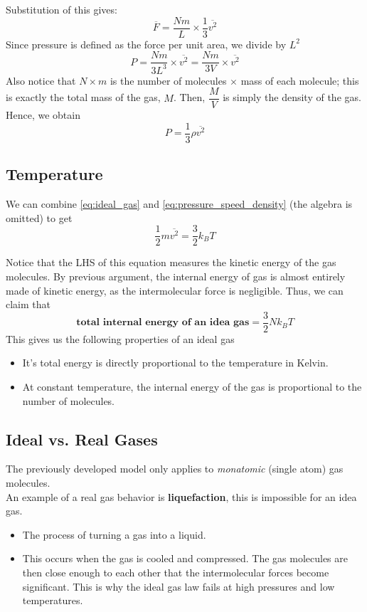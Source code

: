 \documentclass[a4paper,12pt]{article}
\newcommand{\lb}{\\[8pt]}
\begin{document}
Substitution of this gives:
$$\overline{F} = \frac{Nm}{L}\times\frac{1}{3}\overline{v^2}$$
Since pressure is defined as the force per unit area, we divide by $L^2$
$$P = \frac{Nm}{3L^3}\times\overline{v^2} = \frac{Nm}{3V}\times\overline{v^2}$$
Also notice that $N \times m$ is the number of molecules $\times$ mass of each molecule; this is exactly the total mass of the gas, $M$. Then, $\dfrac{M}{V}$ is simply the density of the gas. Hence, we obtain
\begin{equation}\label{eq:pressure_speed_density}
  P = \frac{1}{3}\rho\overline{v^2}
\end{equation}

\subsection{Temperature}

We can combine \cref{eq:ideal_gas} and \cref{eq:pressure_speed_density} (the algebra is omitted) to get
\begin{equation}\label{eq:gas_internal}
  \frac{1}{2}m\overline{v^2} = \frac{3}{2}k_BT
\end{equation}

Notice that the LHS of this equation measures the kinetic energy of the gas molecules. By previous argument, the internal energy of gas is almost entirely made of kinetic energy, as the intermolecular force is negligible. Thus, we can claim that
$$\textbf{total internal energy of an idea gas} = \frac{3}{2}Nk_BT$$
This gives us the following properties of an ideal gas
\begin{itemize}
  \item It's total energy is directly proportional to the temperature in Kelvin.
  \item At constant temperature, the internal energy of the gas is proportional to the number of molecules.
\end{itemize}

\pagebreak

\subsection{Ideal vs. Real Gases}

The previously developed model only applies to \textit{monatomic} (single atom) gas molecules.\lb
An example of a real gas behavior is \textbf{liquefaction}, this is impossible for an idea gas.
\begin{itemize}
  \item The process of turning a gas into a liquid.
  \item This occurs when the gas is cooled and compressed. The gas molecules are then close enough to each other that the intermolecular forces become significant. This is why the ideal gas law fails at high pressures and low temperatures.
\end{itemize}
\end{document}
